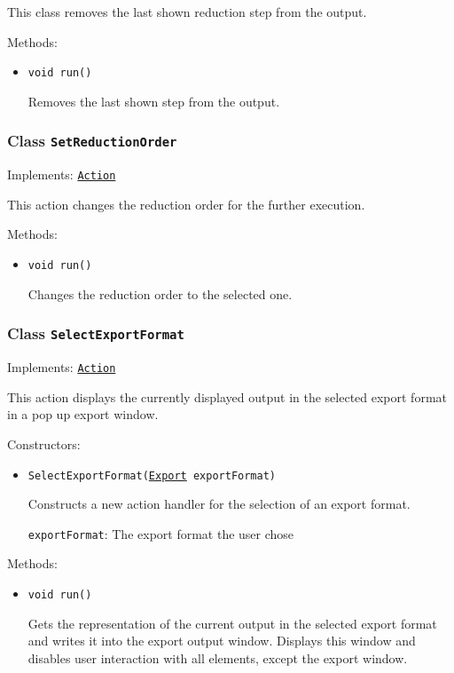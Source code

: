 This class removes the last shown reduction step from the output.

Methods:
\begin{itemize}
\item \texttt{void run()}

Removes the last shown step from the output.

\end{itemize}

\subsubsection{Class \texttt{SetReductionOrder}}
\label{type:edu.kit.wavelength.client.view.action.SetReductionOrder}
Implements: \texttt{\hyperref[type:edu.kit.wavelength.client.view.action.Action]{Action}}

This action changes the reduction order for the further execution.

Methods:
\begin{itemize}
\item \texttt{void run()}

Changes the reduction order to the selected one.

\end{itemize}

\subsubsection{Class \texttt{SelectExportFormat}}
\label{type:edu.kit.wavelength.client.view.action.SelectExportFormat}
Implements: \texttt{\hyperref[type:edu.kit.wavelength.client.view.action.Action]{Action}}

This action displays the currently displayed output in the selected export
 format in a pop up export window.

Constructors:
\begin{itemize}
\item \texttt{SelectExportFormat(\hyperref[type:edu.kit.wavelength.client.view.export.Export]{Export} exportFormat)}

Constructs a new action handler for the selection of an export format.

\texttt{exportFormat}: The export format the user chose

\end{itemize}

Methods:
\begin{itemize}
\item \texttt{void run()}

Gets the representation of the current output in the selected export format
 and writes it into the export output window. Displays this window and disables
 user interaction with all elements, except the export window.

\end{itemize}

